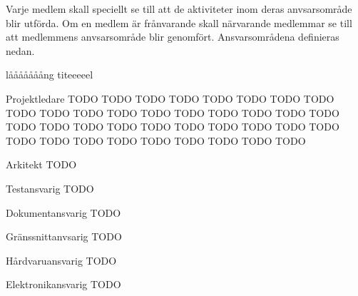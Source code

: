 \documentclass[projektplan/plan.tex]{subfiles}
\begin{document}
Varje medlem skall speciellt se till att de aktiviteter inom deras
anvsarsområde blir utförda. Om en medlem är frånvarande skall närvarande
medlemmar se till att medlemmens anvsarsområde blir genomfört. Ansvarsområdena
definieras nedan.

\begin{labeling}{lååååååång titeeeeel}
    \item[Projektledare] TODO TODO TODO TODO TODO TODO TODO TODO TODO TODO TODO
        TODO TODO TODO TODO TODO TODO TODO TODO TODO TODO TODO TODO TODO TODO
        TODO TODO TODO TODO TODO TODO TODO TODO TODO TODO TODO TODO 
    \item[Arkitekt] TODO
    \item[Testansvarig] TODO 
    \item[Dokumentansvarig] TODO
    \item[Gränssnittanvsarig] TODO
    \item[Hårdvaruansvarig] TODO
    \item[Elektronikansvarig] TODO
\end{labeling}
\end{document}
